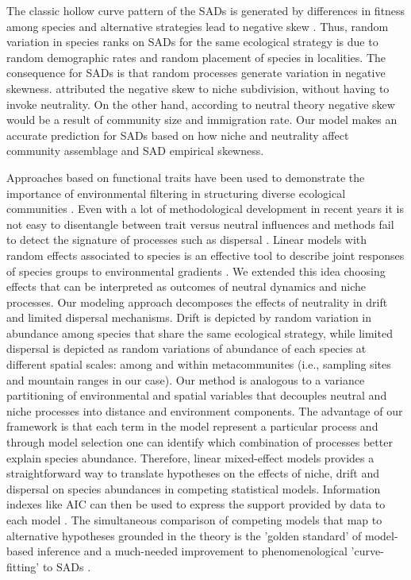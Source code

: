 \documentclass[12pt]{article}
\begin{document}
The classic hollow curve pattern of the SADs is generated by differences in fitness among species and alternative strategies lead to negative skew \citep{Magurran2003}. 
Thus, random variation in species ranks on SADs for the same ecological strategy is due to random demographic rates and random placement of species in localities. 
The consequence for SADs is that random processes generate variation in negative skewness. \cite{Magurran2003} attributed the negative skew to niche subdivision, without having to invoke neutrality. On the other hand, according to neutral theory \citep{Hubbell2001} negative skew would be a result of community size and immigration rate. Our model makes an accurate prediction for SADs based on how niche and neutrality affect community assemblage and SAD empirical skewness.

Approaches based on
functional traits have been used to demonstrate the importance of
environmental  filtering  in  structuring  diverse  ecological
communities \citep{lavorel2002predicting, Baraloto2012}. Even with a
lot of methodological development in recent years it is not easy to
disentangle between trait versus neutral influences and methods fail
to detect the signature of processes such as dispersal
\citep{kembel2009disentangling}. 
Linear models with random effects associated to species is 
an effective tool to describe
joint responses of species groups to environmental
gradients \citep{Jackson2012, Brown2014}. We extended this idea 
 choosing effects that can be interpreted as outcomes of neutral dynamics and niche processes.
Our modeling approach 
decomposes the effects of
neutrality in drift and limited
dispersal mechanisms. Drift is depicted by random variation in
abundance among species that share the same ecological strategy, while
limited dispersal is depicted as random variations of abundance of each
species at different spatial scales: among and within metacommunites (i.e., sampling sites and mountain ranges in our case). 
Our method is analogous to a variance partitioning of environmental and spatial variables \citep{Gilbert2004a} that decouples neutral and niche processes into distance and environment components. The advantage of our framework is that each term in the model represent a particular process and through model selection one can identify which combination of processes better explain species abundance.
Therefore, linear mixed-effect models provides a straightforward way to
translate hypotheses on the effects of niche, drift
and dispersal on species abundances in
competing statistical models. Information indexes like AIC can then be
used to express the support provided by data to each model \citep{Burham2002, Johnson2004}.
The simultaneous comparison of competing models that map
to alternative hypotheses grounded in the theory is the 'golden
standard' of model-based inference \citep{Hilborn1997} 
and a much-needed improvement to
phenomenological 'curve-fitting' to SADs \citep{Mcgill2003}.
\end{document}
